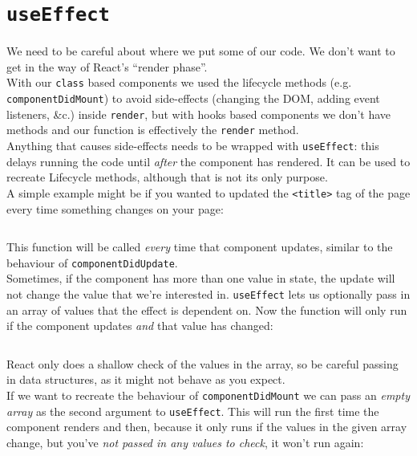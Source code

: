 \section{\texttt{useEffect}}

We need to be careful about where we put some of our code. We don't want to get in the way of React's ``render phase''.
\\

With our \texttt{class} based components we used the lifecycle methods (e.g. \\ \texttt{componentDidMount}) to avoid side-effects (changing the DOM, adding event listeners, \&c.) inside \texttt{render}, but with hooks based components we don't have methods and our function is effectively the \texttt{render} method.
\\

Anything that causes side-effects needs to be wrapped with \texttt{useEffect}: this delays running the code until \textit{after} the component has rendered. It can be used to recreate Lifecycle methods, although that is not its only purpose.
\\

A simple example might be if you wanted to updated the \texttt{<title>} tag of the page every time something changes on your page:

\inputminted{javascript}{05-hooks/figures/09-useEffect.js}

This function will be called \textit{every} time that component updates, similar to the behaviour of \texttt{componentDidUpdate}.
\\

Sometimes, if the component has more than one value in state, the update will not change the value that we're interested in. \texttt{useEffect} lets us optionally pass in an array of values that the effect is dependent on. Now the function will only run if the component updates \textit{and} that value has changed:

\inputminted{javascript}{05-hooks/figures/10-useEffect-dependents.js}

React only does a shallow check of the values in the array, so be careful passing in data structures, as it might not behave as you expect.
\\

If we want to recreate the behaviour of \texttt{componentDidMount} we can pass an \textit{empty array} as the second argument to \texttt{useEffect}. This will run the first time the component renders and then, because it only runs if the values in the given array change, but you've \textit{not passed in any values to check}, it won't run again:

